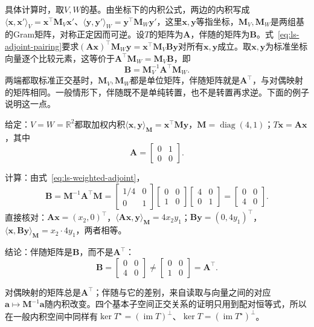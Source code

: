 具体计算时，取$V,W$的基。由坐标下的内积公式，两边的内积写成$\langle\bm x,\bm x'\rangle_V=\bm x^\top\bm M_V\bm x'$、$\langle\bm y,\bm y'\rangle_W=\bm y^\top\bm M_W\bm y'$，这里$\bm x,\bm y$等指坐标，$\bm M_V,\bm M_W$是两组基的Gram矩阵，对称正定因而可逆。设$T$的矩阵为$\bm A$，伴随的矩阵为$\bm B$。式~\eqref{eq:ls-adjoint-pairing}要求$(\bm A\bm x)^\top\bm M_W\bm y=\bm x^\top\bm M_V\bm B\bm y$对所有$\bm x,\bm y$成立。取$\bm x,\bm y$为标准坐标向量逐个比较元素，这等价于$\bm A^\top\bm M_W=\bm M_V\bm B$，即
\begin{equation}
 \bm B=\bm M_V^{-1}\bm A^\top\bm M_W.
 \label{eq:ls-weighted-adjoint}
\end{equation}
两端都取标准正交基时，$\bm M_V,\bm M_W$都是单位矩阵，伴随矩阵就是$\bm A^\top$，与对偶映射的矩阵相同。一般情形下，伴随既不是单纯转置，也不是转置再求逆。下面的例子说明这一点。
\begin{example}[加权内积下的伴随]
\label{ex:ls-weighted-adjoint}
给定：$V=W=\mathbb R^2$都取加权内积$\langle\bm x,\bm y\rangle_{\bm M}=\bm x^\top\bm M\bm y$，$\bm M=\operatorname{diag}(4,1)$；$T\bm x=\bm A\bm x$，其中
\[
 \bm A=\begin{bmatrix}0&1\\0&0\end{bmatrix}.
\]

计算：由式~\eqref{eq:ls-weighted-adjoint}，
\[
 \bm B=\bm M^{-1}\bm A^\top\bm M
 =\begin{bmatrix}1/4&0\\0&1\end{bmatrix}\begin{bmatrix}0&0\\1&0\end{bmatrix}\begin{bmatrix}4&0\\0&1\end{bmatrix}
 =\begin{bmatrix}0&0\\4&0\end{bmatrix}.
\]
直接核对：$\bm A\bm x=(x_2,0)^\top$，$\langle\bm A\bm x,\bm y\rangle_{\bm M}=4x_2y_1$；$\bm B\bm y=(0,4y_1)^\top$，$\langle\bm x,\bm B\bm y\rangle_{\bm M}=x_2\cdot4y_1$，两者相等。

结论：伴随矩阵是$\bm B$，而不是$\bm A^\top$：
\[
 \bm B=\begin{bmatrix}0&0\\4&0\end{bmatrix}\neq\begin{bmatrix}0&0\\1&0\end{bmatrix}=\bm A^\top.
\]
\end{example}
对偶映射的矩阵总是$\bm A^\top$；伴随与它的差别，来自读取与向量之间的对应$\bm a\mapsto\bm M^{-1}\bm a$随内积改变。四个基本子空间正交关系的证明只用到配对恒等式，所以在一般内积空间中同样有$\ker T^\star=(\operatorname{im}T)^\perp$、$\ker T=(\operatorname{im}T^\star)^\perp$。

